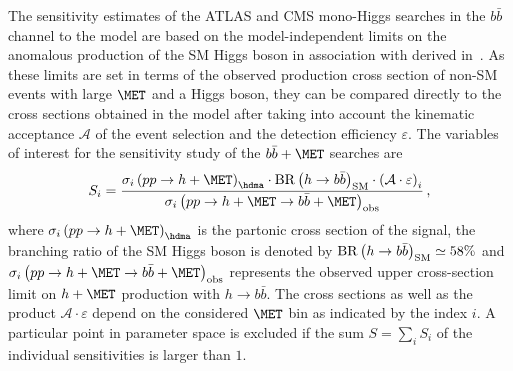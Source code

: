 The sensitivity estimates of the ATLAS and CMS mono-Higgs searches in the $b \bar b$ channel to the \hdma model are based on the model-independent limits on the anomalous production of the SM Higgs boson in association with \met derived in~\cite{Aaboud:2017yqz}.  As these limits are set in terms of the observed production cross section of non-SM events with large $\MET$ and a Higgs boson, they can be compared directly to the cross sections obtained in the \hdma model after taking into account the kinematic acceptance $\mathcal{A}$ of the event selection and the detection efficiency $\varepsilon$. The variables of interest for the sensitivity study of the $b \bar b + \MET$ searches are 
\begin{equation}
\label{eq:monoHbb_sensi}
S_i = \frac{\sigma_{i} \left ( p p \to h + \MET \right)_{\hdma} \cdot {\rm BR} \left (h \to b \bar b \right )_{\rm SM} \cdot \left ( \mathcal{A} \cdot \varepsilon \right)_i}
{\sigma_{i} \left ( p p \to h + \MET \to b \bar b + \MET \right)_{\rm obs}}\,,
\end{equation}
where $\sigma_{i} \left ( p p \to h + \MET \right)_{\hdma}$ is the partonic cross section of the \hdma signal,  the branching ratio of the SM Higgs boson is denoted by ${\rm BR} \left (h \to b \bar b \right )_{\rm SM} \simeq 58\%$  and $\sigma_{i} \left ( p p \to h + \MET \to b \bar b + \MET \right)_{\rm obs}$ represents the  observed upper cross-section limit on $h + \MET$ production with $h \to b \bar b$. The cross sections as well as the product $ \mathcal{A} \cdot \varepsilon$ depend on the considered $\MET$ bin as indicated by the index $i$.  A particular point in parameter space is excluded if the sum $S = \sum_i S_i$ of the individual sensitivities is larger than $1$. 

